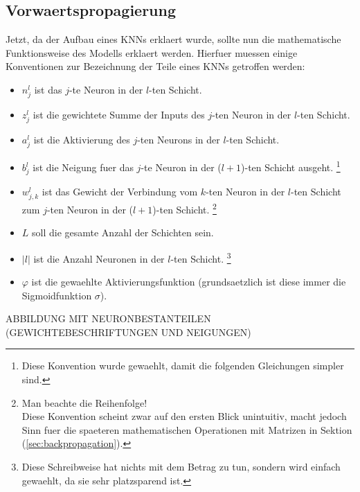 \subsection{Vorwaertspropagierung}
Jetzt, da der Aufbau eines KNNs erklaert wurde, sollte nun die mathematische Funktionsweise
des Modells erklaert werden. Hierfuer muessen einige Konventionen zur
Bezeichnung der Teile eines KNNs getroffen werden:

\begin{itemize}

\item{$n_j^l$ ist das $j$-te Neuron in der $l$-ten Schicht.}
\item{$z_j^l$ ist die gewichtete Summe der Inputs des $j$-ten Neuron in der $l$-ten Schicht.}
\item{$a_j^l$ ist die Aktivierung des $j$-ten Neurons in der $l$-ten Schicht.}
\item{$b_j^l$ ist die Neigung fuer das $j$-te Neuron in der ($l+1$)-ten Schicht ausgeht.
    \footnote{
      Diese Konvention wurde gewaehlt, damit die folgenden Gleichungen simpler sind.
    }
  }
\item{$w_{j,k}^l$ ist das Gewicht der Verbindung vom $k$-ten Neuron
    in der $l$-ten Schicht zum $j$-ten Neuron in der ($l+1$)-ten Schicht.
    \footnote{
      Man beachte die Reihenfolge!\\
      Diese Konvention scheint zwar auf den ersten Blick unintuitiv, macht jedoch
      Sinn fuer die spaeteren mathematischen Operationen mit Matrizen in Sektion
      (\ref{sec:backpropagation}).
    }}

\item{$L$ soll die gesamte Anzahl der Schichten sein.}

\item{$|l|$ ist die Anzahl Neuronen in der $l$-ten Schicht.
    \footnote{
      Diese Schreibweise hat nichts mit dem Betrag zu tun, sondern wird einfach
      gewaehlt, da sie sehr platzsparend ist.
    }
  }

\item{$\varphi$ ist die gewaehlte Aktivierungsfunktion (grundsaetzlich ist diese
    immer die Sigmoidfunktion $\sigma$).}

\end{itemize}

ABBILDUNG MIT NEURONBESTANTEILEN (GEWICHTEBESCHRIFTUNGEN UND NEIGUNGEN)

